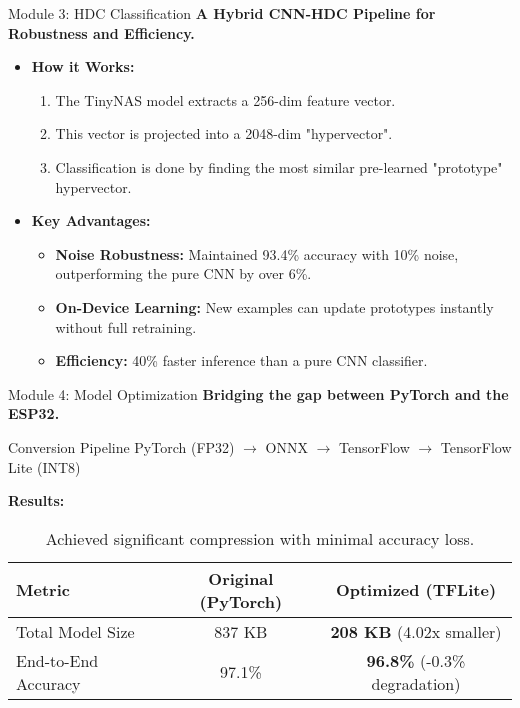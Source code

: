 \documentclass{beamer}
\begin{document}
\begin{frame}{Module 3: HDC Classification}
    \textbf{A Hybrid CNN-HDC Pipeline for Robustness and Efficiency.}
    \begin{itemize}
        \item \textbf{How it Works:}
        \begin{enumerate}
            \item The TinyNAS model extracts a 256-dim feature vector.
            \item This vector is projected into a 2048-dim "hypervector".
            \item Classification is done by finding the most similar pre-learned "prototype" hypervector.
        \end{enumerate}
        \item \textbf{Key Advantages:}
        \begin{itemize}
            \item \textbf{Noise Robustness:} Maintained 93.4\% accuracy with 10\% noise, outperforming the pure CNN by over 6\%.
            \item \textbf{On-Device Learning:} New examples can update prototypes instantly without full retraining.
            \item \textbf{Efficiency:} 40\% faster inference than a pure CNN classifier.
        \end{itemize}
    \end{itemize}
\end{frame}

\begin{frame}{Module 4: Model Optimization}
    \textbf{Bridging the gap between PyTorch and the ESP32.}
    \begin{block}{Conversion Pipeline}
        PyTorch (FP32) $\rightarrow$ ONNX $\rightarrow$ TensorFlow $\rightarrow$ TensorFlow Lite (INT8)
    \end{block}
    \textbf{Results:}
    \begin{table}[]
        \centering
        \begin{tabular}{@{}lcc@{}}
            \toprule
            \textbf{Metric} & \textbf{Original (PyTorch)} & \textbf{Optimized (TFLite)} \\ \midrule
            Total Model Size & 837 KB & \textbf{208 KB} (4.02x smaller) \\
            End-to-End Accuracy & 97.1\% & \textbf{96.8\%} (-0.3\% degradation) \\
            \bottomrule
        \end{tabular}
        \caption{Achieved significant compression with minimal accuracy loss.}
    \end{table}
\end{frame}
\end{document}
